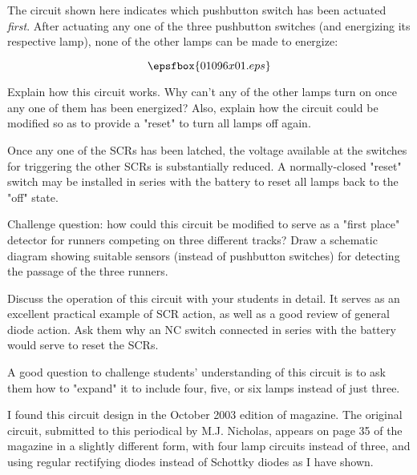 

The circuit shown here indicates which pushbutton switch has been actuated {\it first}.  After actuating any one of the three pushbutton switches (and energizing its respective lamp), none of the other lamps can be made to energize:

$$\epsfbox{01096x01.eps}$$

Explain how this circuit works.  Why can't any of the other lamps turn on once any one of them has been energized?  Also, explain how the circuit could be modified so as to provide a "reset" to turn all lamps off again.







Once any one of the SCRs has been latched, the voltage available at the switches for triggering the other SCRs is substantially reduced.  A normally-closed "reset" switch may be installed in series with the battery to reset all lamps back to the "off" state.

\vskip 10pt

Challenge question: how could this circuit be modified to serve as a "first place" detector for runners competing on three different tracks?  Draw a schematic diagram showing suitable sensors (instead of pushbutton switches) for detecting the passage of the three runners.







Discuss the operation of this circuit with your students in detail.  It serves as an excellent practical example of SCR action, as well as a good review of general diode action.  Ask them why an NC switch connected in series with the battery would serve to reset the SCRs.

A good question to challenge students' understanding of this circuit is to ask them how to "expand" it to include four, five, or six lamps instead of just three.

I found this circuit design in the October 2003 edition of  magazine.  The original circuit, submitted to this periodical by M.J. Nicholas, appears on page 35 of the magazine in a slightly different form, with four lamp circuits instead of three, and using regular rectifying diodes instead of Schottky diodes as I have shown.




